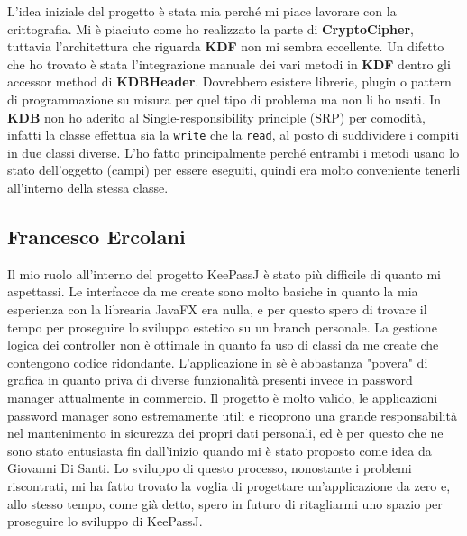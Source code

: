 \documentclass[a4paper,12pt]{report}
\begin{document}
L'idea iniziale del progetto è stata mia perché mi piace lavorare con la crittografia.
Mi è piaciuto come ho realizzato la parte di \textbf{CryptoCipher}, tuttavia l'architettura
che riguarda \textbf{KDF} non mi sembra eccellente. Un difetto che ho trovato
è stata l'integrazione manuale dei vari metodi in \textbf{KDF} dentro gli accessor
method di \textbf{KDBHeader}.  Dovrebbero esistere librerie, plugin o pattern di
programmazione su misura per quel tipo di problema ma non li ho usati.
In \textbf{KDB} non ho aderito al Single-responsibility principle (SRP) per comodità,
infatti la classe effettua sia la \texttt{write} che la \texttt{read}, al posto di suddividere
i compiti in due classi diverse. L'ho fatto principalmente perché entrambi i metodi
usano lo stato dell'oggetto (campi) per essere eseguiti, quindi era molto conveniente
tenerli all'interno della stessa classe.

\subsection*{Francesco Ercolani}
Il mio ruolo all'interno del progetto KeePassJ è stato più difficile di quanto mi aspettassi. 
Le interfacce da me create sono molto basiche in quanto la mia esperienza con la librearia JavaFX era nulla, 
e per questo spero di trovare il tempo per proseguire lo sviluppo estetico su un branch personale. 
La gestione logica dei controller non è ottimale in quanto fa uso di classi da me create che contengono codice ridondante. 
L'applicazione in sè è abbastanza "povera" di grafica in quanto priva di diverse funzionalità presenti invece in password manager attualmente in commercio.
Il progetto è molto valido, le applicazioni password manager sono estremamente utili e ricoprono una grande 
responsabilità nel mantenimento in sicurezza dei propri dati personali, ed è per questo che ne sono stato entusiasta fin dall'inizio quando mi è stato proposto come idea da Giovanni Di Santi.
Lo sviluppo di questo processo, nonostante i problemi riscontrati, mi ha fatto trovato la voglia di progettare un'applicazione da zero
 e, allo stesso tempo, come già detto, spero in futuro di ritagliarmi uno spazio per proseguire lo sviluppo di KeePassJ.
\end{document}
